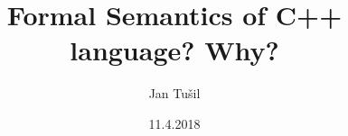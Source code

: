 \documentclass[11pt]{beamer}
\author{Jan Tušil}
\title{Formal Semantics of C++ language? Why?}
\institute{FI MU}
\date{11.4.2018}
\begin{document}


% 

\begin{frame}
\titlepage
\end{frame}
\end{document}
